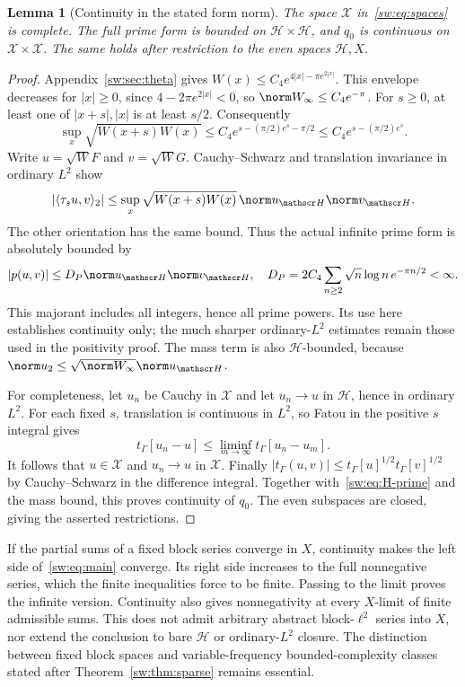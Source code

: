 \documentclass[11pt,a4paper]{article}
\numberwithin{equation}{section}
\newtheorem{lemma}[theorem]{Lemma}
\theoremstyle{definition}\newtheorem{definition}[theorem]{Definition}
\theoremstyle{remark}\newtheorem{remark}[theorem]{Remark}
\newcommand{\tg}{t_\Gamma}\newcommand{\cg}{c_\Gamma}
\begin{document}
\begin{lemma}[Continuity in the stated form norm]\label{sw:lem:domain}
The space $\mathscr X$ in~\eqref{sw:eq:spaces} is complete. The full prime form is bounded on $\mathscr H\times\mathscr H$, and $q_0$ is continuous on $\mathscr X\times\mathscr X$. The same holds after restriction to the even spaces $\mathcal H,X$.
\end{lemma}
\begin{proof}
Appendix~\ref{sw:sec:theta} gives
$W(x)\le C_4e^{4|x|-\pi e^{2|x|}}$. This envelope decreases for $|x|\ge0$, since $4-2\pi e^{2|x|}<0$, so $\norm W_\infty\le C_4e^{-\pi}$. For $s\ge0$, at least one of $|x+s|,|x|$ is at least $s/2$. Consequently
\begin{equation}\label{sw:eq:weighted-shift}
 \sup_x\sqrt{W(x+s)W(x)}
 \le C_4e^{s-(\pi/2)e^s-\pi/2}
 \le C_4e^{s-(\pi/2)e^s}.
\end{equation}
Write $u=\sqrt W F$ and $v=\sqrt W G$. Cauchy--Schwarz and translation invariance in ordinary $L^2$ show
\[
 |\langle\tau_su,v\rangle_2|
 \le\sup_x\sqrt{W(x+s)W(x)}\,\norm u_{\mathscr H}\norm v_{\mathscr H}.
\]
The other orientation has the same bound. Thus the actual infinite prime form is absolutely bounded by
\begin{equation}\label{sw:eq:H-prime}
 |p(u,v)|\le D_P\norm u_{\mathscr H}\norm v_{\mathscr H},
 \quad D_P=2C_4\sum_{n\ge2}\sqrt n\log n\,e^{-\pi n/2}<\infty.
\end{equation}
This majorant includes all integers, hence all prime powers. Its use here establishes continuity only; the much sharper ordinary-$L^2$ estimates remain those used in the positivity proof. The mass term is also $\mathscr H$-bounded, because
$\norm u_2\le\sqrt{\norm W_\infty}\norm u_{\mathscr H}$.

For completeness, let $u_n$ be Cauchy in $\mathscr X$ and let $u_n\to u$ in $\mathscr H$, hence in ordinary $L^2$. For each fixed $s$, translation is continuous in $L^2$, so Fatou in the positive $s$ integral gives
\[
 \tg[u_n-u]\le\liminf_{m\to\infty}\tg[u_n-u_m].
\]
It follows that $u\in\mathscr X$ and $u_n\to u$ in $\mathscr X$. Finally
$|\tg(u,v)|\le\tg[u]^{1/2}\tg[v]^{1/2}$ by Cauchy--Schwarz in the difference integral. Together with~\eqref{sw:eq:H-prime} and the mass bound, this proves continuity of $q_0$. The even subspaces are closed, giving the asserted restrictions.
\end{proof}

If the partial sums of a fixed block series converge in $X$, continuity makes the left side of~\eqref{sw:eq:main} converge. Its right side increases to the full nonnegative series, which the finite inequalities force to be finite. Passing to the limit proves the infinite version. Continuity also gives nonnegativity at every $X$-limit of finite admissible sums. This does not admit arbitrary abstract block-$\ell^2$ series into $X$, nor extend the conclusion to bare $\mathcal H$ or ordinary-$L^2$ closure. The distinction between fixed block spaces and variable-frequency bounded-complexity classes stated after Theorem~\ref{sw:thm:sparse} remains essential.
\end{document}

